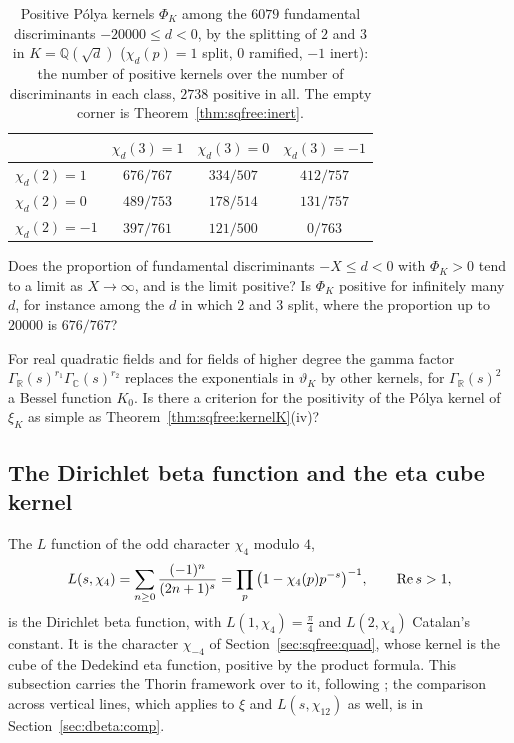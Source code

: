 \begin{table}[htbp]
\centering\small
\begin{tabular}{lccc}
\toprule
 & $\chi_d(3)=1$ & $\chi_d(3)=0$ & $\chi_d(3)=-1$\\
\midrule
$\chi_d(2)=1$ & $676/767$ & $334/507$ & $412/757$\\
$\chi_d(2)=0$ & $489/753$ & $178/514$ & $131/757$\\
$\chi_d(2)=-1$ & $397/761$ & $121/500$ & $0/763$\\
\bottomrule
\end{tabular}
\caption{Positive P\'olya kernels $\Phi_K$ among the $6079$ fundamental discriminants $-20000\le d<0$, by the splitting of $2$ and $3$ in $K=\mathbb Q(\sqrt d)$ ($\chi_d(p)=1$ split, $0$ ramified, $-1$ inert): the number of positive kernels over the number of discriminants in each class, $2738$ positive in all. The empty corner is Theorem~\ref{thm:sqfree:inert}.}
\label{tab:sqfree:quad}
\end{table}

\begin{question}\label{q:sqfree:density}
Does the proportion of fundamental discriminants $-X\le d<0$ with $\Phi_K>0$ tend to a limit as $X\to\infty$, and is the limit positive? Is $\Phi_K$ positive for infinitely many $d$, for instance among the $d$ in which $2$ and $3$ split, where the proportion up to $20000$ is $676/767$?
\end{question}

\begin{question}\label{q:sqfree:realquad}
For real quadratic fields and for fields of higher degree the gamma factor $\Gamma_{\mathbb R}(s)^{r_1}\Gamma_{\mathbb C}(s)^{r_2}$ replaces the exponentials in $\vartheta_K$ by other kernels, for $\Gamma_{\mathbb R}(s)^2$ a Bessel function $K_0$. Is there a criterion for the positivity of the P\'olya kernel of $\xi_K$ as simple as Theorem~\ref{thm:sqfree:kernelK}(iv)?
\end{question}

\subsection{The Dirichlet beta function and the eta cube kernel}\label{sec:dbeta:beta}

The $L$ function of the odd character $\chi_4$ modulo $4$,
\[
L(s,\chi_4)=\sum_{n\ge0}\frac{(-1)^n}{(2n+1)^s}=\prod_p\big(1-\chi_4(p)p^{-s}\big)^{-1},\qquad\operatorname{Re} s>1,
\]
is the Dirichlet beta function, with $L(1,\chi_4)=\frac\pi4$ and $L(2,\chi_4)$ Catalan's constant. It is the character $\chi_{-4}$ of Section~\ref{sec:sqfree:quad}, whose kernel is the cube of the Dedekind eta function, positive by the product formula. This subsection carries the Thorin framework over to it, following \cite{P26beta}; the comparison across vertical lines, which applies to $\xi$ and $L(s,\chi_{12})$ as well, is in Section~\ref{sec:dbeta:comp}.

